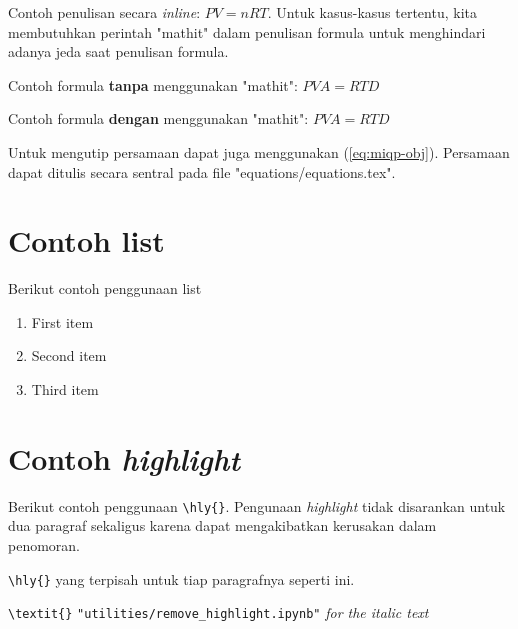 Contoh penulisan secara \textit{inline}: $\mathit{PV = nRT}$. Untuk kasus-kasus tertentu, kita membutuhkan perintah "mathit" dalam penulisan formula untuk menghindari adanya jeda saat penulisan formula.

Contoh formula \textbf{tanpa} menggunakan "mathit": $PVA = RTD$

Contoh formula \textbf{dengan} menggunakan "mathit": $\mathit{PVA = RTD}$

Untuk mengutip persamaan dapat juga menggunakan (\ref{eq:miqp-obj}). Persamaan dapat ditulis secara sentral pada file "equations/equations.tex".


\section{Contoh list}
Berikut contoh penggunaan list
\begin{enumerate}
    \item First item
    \item Second item
    \item Third item
\end{enumerate}

\section{Contoh \textit{highlight}}
Berikut contoh penggunaan  \verb|\hly{}|. Pengunaan \textit{highlight} tidak disarankan untuk dua paragraf sekaligus karena dapat mengakibatkan kerusakan dalam penomoran.

 \verb|\hly{}| yang terpisah untuk tiap paragrafnya seperti ini.

 \verb|\textit{}|  \verb|"utilities/remove_highlight.ipynb"|  \textit{for the italic text} 
